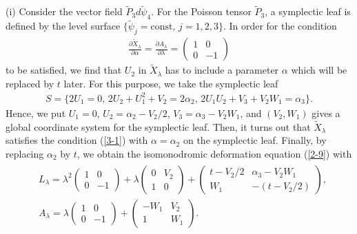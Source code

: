 \documentclass[10pt,a4paper]{amsart}
\numberwithin{equation}{section}
\begin{document}
(i) Consider the vector f\/ield $\widetilde{P}_3 d\widetilde{\psi}_4$. For the Poisson tensor $\widetilde{P}_3$, a symplectic leaf is def\/ined by the level surface $\{ \widetilde{\psi}_j = \text{const},\, j=1,2,3\}$. In order for the condition
\begin{gather}
\frac{\partial \widetilde{X}_\lambda }{\partial \alpha } = \frac{\partial A_\lambda }{\partial \lambda } = \left(
\begin{matrix}
1 & 0 \\
0 & -1
\end{matrix}
\right) \label{3-1}
\end{gather}
to be satisf\/ied, we f\/ind that $U_2$ in $\widetilde{X}_\lambda $ has to include a parameter $\alpha $ which will be replaced by $t$ later.
For this purpose, we take the symplectic leaf
\begin{gather*}
S = \big\{ 2U_1 = 0,\, 2U_2+U_1^2+V_2 = 2\alpha _2 ,\, 2U_1U_2 + V_3 + V_2W_1 = \alpha _3 \big\}.
\end{gather*}
Hence, we put $U_1 = 0$, $U_2 = \alpha _2 - V_2/2$, $V_3 = \alpha _3 - V_2W_1$, and $(V_2, W_1)$ gives a global coordinate system for the symplectic leaf. Then, it turns out that $\widetilde{X}_\lambda $ satisf\/ies the condition (\ref{3-1}) with $\alpha =\alpha _2$ on the symplectic leaf. Finally, by replacing $\alpha _2$ by $t$, we obtain the isomonodromic deformation equation (\ref{2-9}) with
\begin{gather*}
\begin{split}
& L_\lambda = \lambda ^2 \left(
\begin{matrix}
1 & 0 \\
0 & -1
\end{matrix}
\right) + \lambda \left(
\begin{matrix}
0 & V_2 \\
1 & 0
\end{matrix}
\right) + \left(
\begin{matrix}
t-V_2/2 & \alpha _3 - V_2W_1 \\
W_1 & -(t-V_2/2)
\end{matrix}
\right), \\
& A_\lambda = \lambda \left(
\begin{matrix}
1 & 0 \\
0 & -1
\end{matrix}
\right) + \left(
\begin{matrix}
-W_1 & V_2 \\
1 & W_1
\end{matrix}
\right).
\end{split}
\end{gather*}
\end{document}
